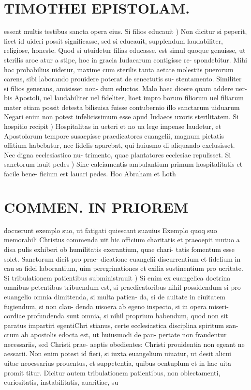 \documentclass{article}
\begin{document}
\begin{pages}
\section*{TIMOTHEI EPISTOLAM. }
\marginpar{[ p.127 ]}\pstart essent multis testibus sancta opera eius.  \pend\pstart Si filios educauit ) Non dicitur si peperit, licet id uideri possit significasse, sed si educauit, supplendum laudabiliter, religiose, honeste. Quod si utuidetur filias educasse, est simul quoque genuisse, ut sterilis aroe atur a stipe, hoc in gracia Iudaearum contigisse re- spondebitur. Mihi hoc probabilius uidetur, maxime cum sterilis tanta aetate molestiis puerorum carens, sibi laborando prouidere poterat de senectutis su- stentamento. Similiter si filios generans, amisisset non- dum eductos. Malo haec dioere quam addere uer- bis Apostoli, uel laudabiliter uel fideliter, lioet impro borum filiorum uel filiarum mater etiam possit detesta bilisuisa fuisse contubernio illo sanctarum uiduarum Negari enim non potest infelicissimum esse apud Iudaeos uxoris sterilitatem.  \pend\pstart Si hospitio recipit ) Hospitalitas in ueteri et no ua lege impense laudetur, et Apostolorum tempore susaepisse praedicatores cuangelii, magnum pietatis offitium habebatur, nec fidelis aparebat, qui huiusmo di aliquando exclusisset. Nec digna ecclesiastico nu- trimento, quae plantatores ecclesiae repulisset.  \pend\pstart Si sanctorum lauit pedes ) Sine calciamentis ambulantium primum hospitalitatis et facile bene- ficium est lauari pedes. Hoc Abraham et Loth  \pend
\section*{COMMEN. IN PRIOREM }
\marginpar{[ p.128 ]}\pstart docuerunt exemplo suo, ut fatigati quiescant suauius Exemplo quoq suo memorabili Christus commenda uit hic officium charitatis et praeoepit mutuo a disa pulis exhiberi ob humilitatis exerantium, quae chari- tatis fomentum esse solet. Sanctorum dicit pro prae- dicatione euangelii discurrentium et fidelium in cau sa fidei laborantium, uim peregrinationes et exilia sustinentium pro ucritate.  \pend\pstart Si tribulationem patientibus subministrauit ) Si enim ex euangelica doctrina omnibus petentibus tribuendum est, si praedicatoribus nihil possidendum si pro euangelio omnia dimittenda, si multa patien- da, si de auitate in ciuitatem fugiendum, si non clau- denda uisoera ab egeno inspecto, si in opera miseri- cordiae profundenda sunt omnia, si nihil proprium habendum, quod non sit paratus impartiri egentiChri stianus, certe ecclesiastica disciplina spiritum san- ctum ab apostolis edocta est, ut huiusmodi de pau- pertate non fraudentur necessariis, sed Christi prae- aeptis obedientes: Christi prouidentia non egeant ne aessarii. Non enim potest id fieri, si iuxta euangelium uiuatur, ut desit alicui uitae neoessarius prouentus, et suppetentia, quibus oentuplum et in hac uita promit titur. Dicitur autem tribulationem patientibus, non oblectamenti, curiositatis, instabilitatis, auaritiae, su-  \pend

\end{pages}
\end{document}
